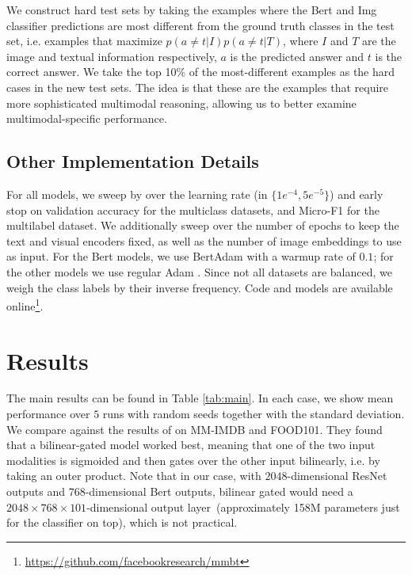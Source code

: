 \documentclass[11pt,a4paper]{article}
\begin{document}
We construct hard test sets by taking the examples where the Bert and Img classifier predictions are most different from the ground truth classes in the test set, i.e. examples that maximize $p(a\neq t|I)p(a\neq t|T)$, where $I$ and $T$ are the image and textual information respectively, $a$ is the predicted answer and $t$ is the correct answer. We take the top 10\% of the most-different examples as the hard cases in the new test sets. The idea is that these are the examples that require more sophisticated multimodal reasoning, allowing us to better examine multimodal-specific performance.



\subsection{Other Implementation Details} For all models, we sweep by over the learning rate (in $\{1e^{-4},5e^{-5}\}$) and early stop on validation accuracy for the multiclass datasets, and Micro-F1 for the multilabel dataset. We additionally sweep over the number of epochs to keep the text and visual encoders fixed, as well as the number of image embeddings to use as input. For the Bert models, we use BertAdam \cite{Devlin:2019naacl} with a warmup rate of $0.1$; for the other models we use regular Adam \cite{Kingma:2014adam}. Since not all datasets are balanced, we weigh the class labels by their inverse frequency. Code and models are available online\footnote{\href{https://github.com/facebookresearch/mmbt}{https://github.com/facebookresearch/mmbt}}.

\section{Results}

The main results can be found in Table \ref{tab:main}. In each case, we show mean performance over $5$ runs with random seeds together with the standard deviation. We compare against the results of \cite{Kiela:2018aaai} on MM-IMDB and FOOD101. They found that a bilinear-gated model worked best, meaning that one of the two input modalities is sigmoided and then gates over the other input bilinearly, i.e. by taking an outer product. Note that in our case, with $2048$-dimensional ResNet outputs and $768$-dimensional Bert outputs, bilinear gated would need a $2048\times768\times101$-dimensional output layer~(approximately 158M parameters just for the classifier on top), which is not practical.
\end{document}
